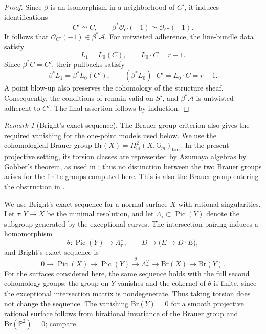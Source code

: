\documentclass[11pt]{article}
\theoremstyle{plain}
\theoremstyle{definition}
\theoremstyle{remark}
\newtheorem{remark}[remark]{Remark}
\newcommand{\Pp}{\mathbb P}
\newcommand{\Pic}{\operatorname{Pic}}
\newcommand{\Br}{\mathrm{Br}}
\newcommand{\OO}{\mathcal O}
\begin{document}
\begin{proof}
Since \(\beta\) is an isomorphism in a neighborhood of \(C'\), it induces
identifications
\[
C'\simeq C,
\qquad
\beta^*\OO_C(-1)\simeq\OO_{C'}(-1).
\]
It follows that \(\OO_{C'}(-1)\in\beta^*\mathcal A\). For untwisted adherence, the
line-bundle data satisfy
\[
L_1=L_0(C),
\qquad
L_0\cdot C=r-1.
\]
Since \(\beta^*C=C'\), their pullbacks satisfy
\[
\beta^*L_1=\beta^*L_0(C'),
\qquad
(\beta^*L_0)\cdot C'=L_0\cdot C=r-1.
\]
A point blow-up also preserves the cohomology of the structure sheaf.
Consequently, the conditions of \cite[Lemma~3.5 and Definition~3.6]{KKS2020} remain
valid on \(S'\), and \(\beta^*\mathcal A\) is untwisted adherent to \(C'\).
The final assertion follows by induction.
\end{proof}

\begin{remark}[Bright's exact sequence]\label{rem:brauer-obstruction}
The Brauer-group criterion also gives the required vanishing for the one-point
models used below. We use the cohomological Brauer group
\(\Br(X)=H^2_{\mathrm{\acute et}}(X,\mathbb G_m)_{\mathrm{tors}}\). In
the present projective setting, its torsion classes are represented by Azumaya
algebras by Gabber's theorem, as used in
\cite[proof of Theorem~6]{Bright2013}; thus no distinction between the two
Brauer groups arises for the finite groups computed here. This is also the
Brauer group entering the obstruction in \cite[Corollary~4.8]{KKS2020}.

We use Bright's exact sequence for a normal surface \(X\) with rational
singularities. Let \(\tau:Y\to X\) be the minimal resolution, and let
\(\Lambda_\tau\subset \Pic(Y)\) denote the subgroup generated by the exceptional
curves. The intersection pairing induces a homomorphism
\[
\theta:\Pic(Y)\longrightarrow \Lambda_\tau^\vee,
\qquad
D\longmapsto \bigl(E\mapsto D\cdot E\bigr),
\]
and Bright's exact sequence \cite[Proposition~1]{Bright2013} is
\[
0
\longrightarrow
\Pic(X)
\longrightarrow
\Pic(Y)
\xrightarrow{\theta}
\Lambda_\tau^\vee
\longrightarrow
\Br(X)
\longrightarrow
\Br(Y).
\]
For the surfaces considered here,
the same sequence holds with the full second cohomology groups: the group
on \(Y\) vanishes and the cokernel of \(\theta\) is finite, since the
exceptional intersection matrix is nondegenerate. Thus taking torsion does
not change the sequence. The vanishing \(\Br(Y)=0\) for a smooth projective
rational surface follows from birational invariance of the Brauer group
and \(\Br(\Pp^2)=0\); compare \cite[Section~3]{Bright2013}.
\end{remark}
\end{document}
